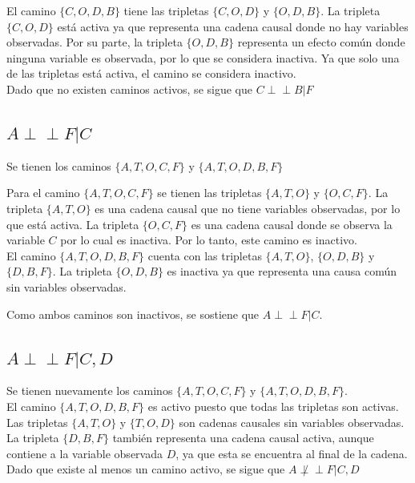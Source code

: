 \documentclass[letterpaper,12pt]{article}
\theoremstyle{definition}
\begin{document}
El camino \(\{C,O,D,B\}\) tiene las tripletas \(\{C,O,D\}\) y \(\{O,D,B\}\). La tripleta  \(\{C,O,D\}\) está activa ya que representa una cadena causal donde no hay variables observadas. Por su parte, la tripleta \(\{O,D,B\}\) representa un efecto común donde ninguna variable es observada, por lo que se considera inactiva. Ya que solo una de las tripletas está activa, el camino se considera inactivo.\\

Dado que no existen caminos activos, se sigue que \(C \perp\!\!\!\perp B | F\)

\subsection*{\(A  \perp\!\!\!\perp F | C\)}

Se tienen los caminos \(\{A,T,O,C,F\}\) y \(\{A,T,O,D,B,F\}\)

Para el camino \(\{A,T,O,C,F\}\) se tienen las tripletas \(\{A,T,O\}\)  y \(\{O,C,F\}\). La tripleta \(\{A,T,O\}\) es una cadena causal que no tiene variables observadas, por lo que está activa. La tripleta \(\{O,C,F\}\) es una cadena causal donde se observa la variable \(C\) por lo cual es inactiva. Por lo tanto, este camino es inactivo.\\


El camino  \(\{A,T,O,D,B,F\}\) cuenta con las tripletas  \(\{A,T,O\}\), \(\{O,D,B\}\) y  \(\{D,B,F\}\). La tripleta  \(\{O,D,B\}\) es inactiva ya que representa una causa común sin variables observadas.

Como ambos caminos son inactivos, se sostiene que \(A  \perp\!\!\!\perp F | C\).

\subsection*{\(A  \perp\!\!\!\perp F | C,D\)}

Se tienen nuevamente los caminos \(\{A,T,O,C,F\}\) y \(\{A,T,O,D,B,F\}\).\\

El camino  \(\{A,T,O,D,B,F\}\) es activo puesto que todas las tripletas son activas. Las tripletas \(\{A,T,O\}\) y \(\{T,O,D\}\) son cadenas causales sin variables observadas. La tripleta \(\{D,B,F\}\) también representa una cadena causal activa, aunque contiene a la variable observada \(D\), ya que esta se encuentra al final de la cadena.\\

Dado que existe al menos un camino activo, se sigue que \(A  \not\perp\!\!\!\perp F | C,D\)
\end{document}
